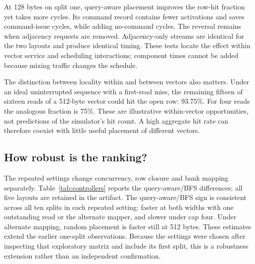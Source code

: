 \documentclass[conference]{IEEEtran}
\begin{document}
\begin{table}[htbp]\centering\small\setlength{\tabcolsep}{4pt}
\caption{Flat-replay mean cycle difference relative to BFS and paired 95\% interval over ten query splits. Negative is faster. The 128-byte case changes storage footprint while retaining float32 search.}\label{tab:real}

\end{table}

At 128 bytes on split one, query-aware placement improves the row-hit fraction yet takes \MixedDeltaCycles{} more cycles. Its command record contains \MixedSavedACT{} fewer activations and saves \MixedSavedCommands{} command-issue cycles, while adding \MixedExtraNoCommand{} no-command cycles. The reversal remains when adjacency requests are removed. Adjacency-only streams are identical for the two layouts and produce identical timing. These tests locate the effect within vector service and scheduling interactions; component times cannot be added because mixing traffic changes the schedule.

The distinction between locality within and between vectors also matters. Under an ideal uninterrupted sequence with a first-read miss, the remaining fifteen of sixteen reads of a 512-byte vector could hit the open row: 93.75\%. For four reads the analogous fraction is 75\%. These are illustrative within-vector opportunities, not predictions of the simulator's hit count. A high aggregate hit rate can therefore coexist with little useful placement of different vectors.

\subsection{How robust is the ranking?}
The repeated settings change concurrency, row closure and bank mapping separately. Table~\ref{tab:controllers} reports the query-aware/BFS differences; all five layouts are retained in the artifact. The query-aware/BFS sign is consistent across all ten splits in each repeated setting: faster at both widths with one outstanding read or the alternate mapper, and slower under cap four. Under alternate mapping, random placement is faster still at 512 bytes. These estimates extend the earlier one-split observations. Because the settings were chosen after inspecting that exploratory matrix and include its first split, this is a robustness extension rather than an independent confirmation.

\begin{table}[htbp]\centering\small\setlength{\tabcolsep}{3.8pt}
\caption{Selected controller settings repeated across ten paired splits. Other controller and heuristic ablations remain single-split exploratory results.}\label{tab:controllers}

\end{table}
\end{document}
